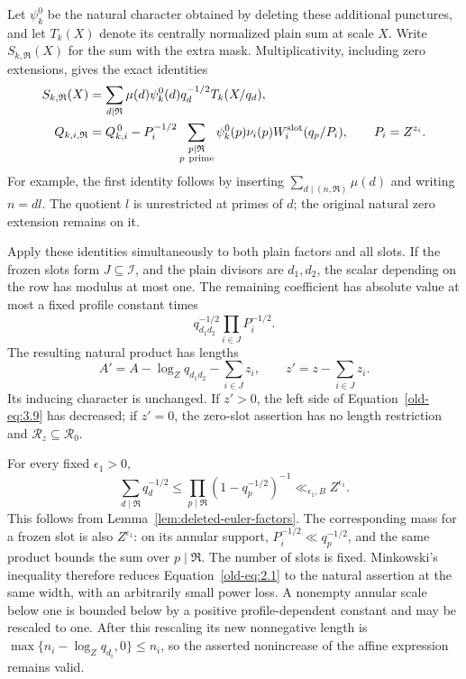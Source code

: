 \documentclass[11pt,a4paper]{article}
\numberwithin{equation}{section}
\numberwithin{figure}{section}
\theoremstyle{definition}
\theoremstyle{remark}
\begin{document}
Let \(\psi_k^0\) be the natural character obtained by deleting these
additional punctures, and let \(T_k(X)\) denote its centrally
normalized plain sum at scale \(X\).  Write \(S_{k,\mathfrak R}(X)\)
for the sum with the extra mask.  Multiplicativity, including zero
extensions, gives the exact identities
\begin{align}
 S_{k,\mathfrak R}(X)
 &=\sum_{d\mid\mathfrak R}\mu(d)\psi_k^0(d)q_d^{-1/2}
                  T_k(X/q_d),
 \label{old-eq:2.1a}\\
 Q_{k,i,\mathfrak R}
 &=Q_{k,i}^{\,0}
   -P_i^{-1/2}\sum_{\substack{p\mid\mathfrak R\\p\ {\rm prime}}}
       \psi_k^0(p)\nu_i(p)W_i^{\rm slot}(q_p/P_i),
 \qquad P_i=Z^{z_i}.
 \label{eq:prime-mask-erasure}
\end{align}
For example, the first identity follows by inserting
\(\sum_{d\mid(n,\mathfrak R)}\mu(d)\) and writing \(n=dl\).
The quotient \(l\) is unrestricted at primes of \(d\); the original
natural zero extension remains on it.

Apply these identities simultaneously to both plain factors and all
slots.  If the frozen slots form \(J\subseteq\mathcal I\), and the
plain divisors are \(d_1,d_2\), the scalar depending on the row has
modulus at most one.  The remaining coefficient has absolute value at
most a fixed profile constant times
\[
 q_{d_1d_2}^{-1/2}\prod_{i\in J}P_i^{-1/2}.
\]
The resulting natural product has lengths
\[
 A'=A-\log_Zq_{d_1d_2}-\sum_{i\in J}z_i,\qquad
 z'=z-\sum_{i\in J}z_i.
\]
Its inducing character is unchanged.  If \(z'>0\), the left side of
Equation~\eqref{old-eq:3.9} has decreased; if \(z'=0\), the zero-slot
assertion has no length restriction and
\(\mathcal R_z\subseteq\mathcal R_0\).

For every fixed \(\epsilon_1>0\),
\begin{equation}
 \sum_{d\mid\mathfrak R}q_d^{-1/2}
 \le \prod_{p\mid\mathfrak R}(1-q_p^{-1/2})^{-1}
 \ll_{\epsilon_1,B} Z^{\epsilon_1}.
 \label{old-eq:2.1b}
\end{equation}
This follows from Lemma~\ref{lem:deleted-euler-factors}.  The corresponding
mass for a frozen slot is also \(Z^{\epsilon_1}\): on its annular support,
\(P_i^{-1/2}\ll q_p^{-1/2}\), and the same product bounds the sum over
\(p\mid\mathfrak R\).  The number of slots is fixed.  Minkowski's
inequality therefore reduces Equation~\eqref{old-eq:2.1} to the
natural assertion at the same width, with an arbitrarily small power
loss.  A nonempty annular scale below one is bounded below by a
positive profile-dependent constant and may be rescaled to one.
After this rescaling its new nonnegative length is
\(\max\{n_i-\log_Zq_{d_i},0\}\le n_i\), so the asserted
nonincrease of the affine expression remains valid.
\end{document}
